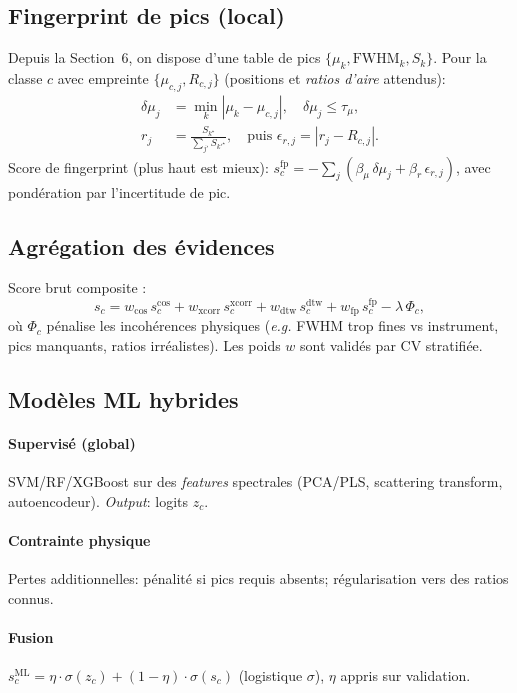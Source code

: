 \subsection{Fingerprint de pics (local)}
Depuis la Section~6, on dispose d'une table de pics $\{\mu_k, \mathrm{FWHM}_k, S_k\}$. Pour la classe $c$ avec empreinte $\{\mu_{c,j}, R_{c,j}\}$ (positions et \emph{ratios d'aire} attendus):
\begin{align}
\delta\mu_{j} &= \min_{k} |\mu_k - \mu_{c,j}|, \quad \delta\mu_{j}\le \tau_\mu,\\
r_{j} &= \frac{S_{k^\star}}{\sum_{j'} S_{k'^\star}}, \quad \text{puis } \epsilon_{r,j}=|r_{j}-R_{c,j}|.
\end{align}
Score de fingerprint (plus haut est mieux): $s_c^{\mathrm{fp}} = -\sum_j \left( \beta_\mu\,\delta\mu_j + \beta_r\,\epsilon_{r,j}\right)$, avec pondération par l'incertitude de pic.

\subsection{Agrégation des évidences}
Score brut composite :
\begin{equation}
s_c = w_{\cos}\,s_c^{\cos} + w_{\mathrm{xcorr}}\,s_c^{\mathrm{xcorr}} + w_{\mathrm{dtw}}\,s_c^{\mathrm{dtw}} + w_{\mathrm{fp}}\,s_c^{\mathrm{fp}} - \lambda\,\Phi_c,
\end{equation}
où $\Phi_c$ pénalise les incohérences physiques (\emph{e.g.} FWHM trop fines vs instrument, pics manquants, ratios irréalistes). Les poids $w$ sont validés par CV stratifiée.

\subsection{Modèles ML hybrides}
\paragraph{Supervisé (global)} SVM/RF/XGBoost sur des \emph{features} spectrales (PCA/PLS, scattering transform, autoencodeur). \emph{Output}: logits $z_c$.
\paragraph{Contrainte physique} Pertes additionnelles: pénalité si pics requis absents; régularisation vers des ratios connus.
\paragraph{Fusion} $s_c^{\mathrm{ML}}=\eta\cdot \sigma(z_c) + (1-\eta)\cdot \sigma(s_c)$ (logistique $\sigma$), $\eta$ appris sur validation.

